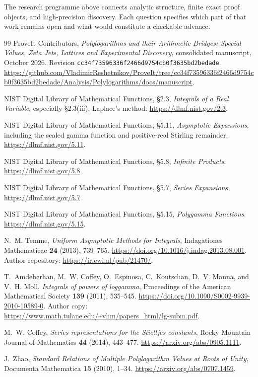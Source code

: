 \documentclass[11pt,letterpaper]{article}
\numberwithin{equation}{section}
\theoremstyle{plain}
\theoremstyle{definition}
\theoremstyle{remark}
\newcommand{\src}[1]{\nolinkurl{#1}}
\begin{document}
The research programme above connects analytic structure, finite
exact proof objects, and high-precision discovery. Each question
specifies which part of that work remains open and what would
constitute a checkable advance.




\begin{thebibliography}{99}
ProveIt Contributors,
\emph{Polylogarithms and their Arithmetic Bridges: Special Values,
Zeta Jets, Lattices and Experimental Discovery},
consolidated manuscript, October 2026.
Revision \src{cc34f73596336f2466d9754cb0f3635bd2bedade}.
\url{https://github.com/VladimirReshetnikov/ProveIt/tree/cc34f73596336f2466d9754cb0f3635bd2bedade/Analysis/Polylogarithms/docs/manuscript}.

NIST Digital Library of Mathematical Functions,
\S2.3, \emph{Integrals of a Real Variable}, especially
\S2.3(iii), Laplace's method.
\url{https://dlmf.nist.gov/2.3}.

NIST Digital Library of Mathematical Functions,
\S5.11, \emph{Asymptotic Expansions}, including the scaled gamma
function and positive-real Stirling remainder.
\url{https://dlmf.nist.gov/5.11}.

NIST Digital Library of Mathematical Functions,
\S5.8, \emph{Infinite Products}.
\url{https://dlmf.nist.gov/5.8}.

NIST Digital Library of Mathematical Functions,
\S5.7, \emph{Series Expansions}.
\url{https://dlmf.nist.gov/5.7}.

NIST Digital Library of Mathematical Functions,
\S5.15, \emph{Polygamma Functions}.
\url{https://dlmf.nist.gov/5.15}.

N.~M. Temme,
\emph{Uniform Asymptotic Methods for Integrals},
Indagationes Mathematicae \textbf{24} (2013), 739--765.
\url{https://doi.org/10.1016/j.indag.2013.08.001}.
Author repository: \url{https://ir.cwi.nl/pub/21470/}.

T.~Amdeberhan, M.~W. Coffey, O.~Espinosa, C.~Koutschan,
D.~V. Manna, and V.~H. Moll,
\emph{Integrals of powers of loggamma},
Proceedings of the American Mathematical Society \textbf{139}
(2011), 535--545.
\url{https://doi.org/10.1090/S0002-9939-2010-10589-0}.
Author copy: \url{https://www.math.tulane.edu/~vhm/papers_html/lg-subm.pdf}.

M.~W. Coffey, \emph{Series representations for the Stieltjes constants},
Rocky Mountain Journal of Mathematics \textbf{44} (2014), 443--477.
\url{https://arxiv.org/abs/0905.1111}.

J.~Zhao,
\emph{Standard Relations of Multiple Polylogarithm Values at Roots of Unity},
Documenta Mathematica \textbf{15} (2010), 1--34.
\url{https://arxiv.org/abs/0707.1459}.
\end{thebibliography}
\end{document}
